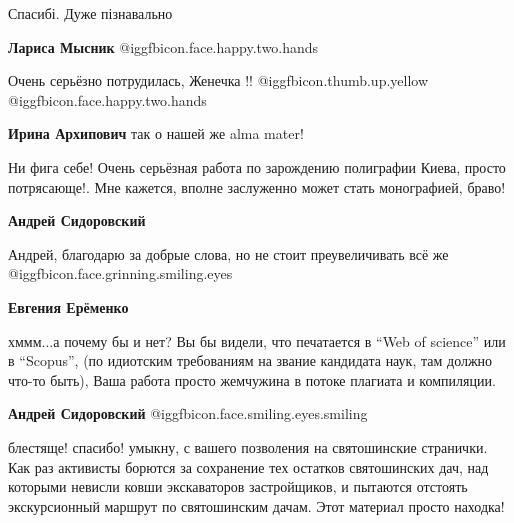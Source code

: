  
 
 
 
 
\zzSecCmt

\begin{itemize} %
Спасибі. Дуже пізнавально

\textbf{Лариса Мысник}  @igg{fbicon.face.happy.two.hands} 

Очень серьёзно потрудилась, Женечка !!  @igg{fbicon.thumb.up.yellow}  @igg{fbicon.face.happy.two.hands} 

\textbf{Ирина Архипович} так о нашей же alma mater!


Ни фига себе! Очень серьёзная работа по зарождению полиграфии Киева, просто
потрясающе!. Мне кажется, вполне заслуженно может стать монографией, браво!

\begin{itemize} %
\textbf{Андрей Сидоровский} 

Андрей, благодарю за добрые слова, но не стоит преувеличивать всё же
@igg{fbicon.face.grinning.smiling.eyes} 

\textbf{Евгения Ерёменко} 

хммм...а почему бы и нет? Вы бы видели, что печатается в \enquote{Web of science} или в
\enquote{Scopus}, (по идиотским требованиям на звание кандидата наук, там должно что-то
быть), Ваша работа просто жемчужина в потоке плагиата и компиляции.


\textbf{Андрей Сидоровский}  @igg{fbicon.face.smiling.eyes.smiling} 
\end{itemize} %


блестяще! спасибо! умыкну, с вашего позволения на святошинские странички. Как
раз активисты борются за сохранение тех остатков святошинских дач, над которыми
невисли ковши экскаваторов застройщиков, и пытаются отстоять экскурсионный
маршрут по святошинским дачам. Этот материал просто находка!


\end{itemize}

